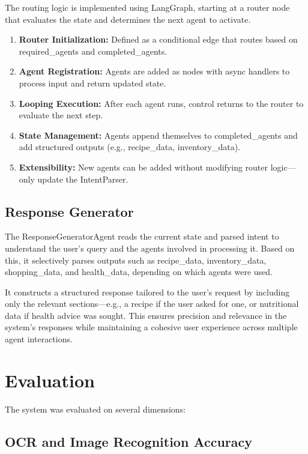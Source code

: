 \documentclass{ecai}
\begin{document}
The routing logic is implemented using LangGraph, starting at a router node that evaluates the state and determines the next agent to activate.
\begin{enumerate}[noitemsep,topsep=0pt]
    \item \textbf{Router Initialization:} Defined as a conditional edge that routes based on required\_agents and completed\_agents.
    \item \textbf{Agent Registration:} Agents are added as nodes with async handlers to process input and return updated state.
    \item \textbf{Looping Execution:} After each agent runs, control returns to the router to evaluate the next step.
    \item \textbf{State Management:} Agents append themselves to completed\_agents and add structured outputs (e.g., recipe\_data, inventory\_data).
    \item \textbf{Extensibility:} New agents can be added without modifying router logic—only update the IntentParser.
\end{enumerate}

\subsection{Response Generator}

The ResponseGeneratorAgent reads the current state and parsed intent to understand the user's query and the agents involved in processing it. Based on this, it selectively parses outputs such as recipe\_data, inventory\_data, shopping\_data, and health\_data, depending on which agents were used.

It constructs a structured response tailored to the user's request by including only the relevant sections—e.g., a recipe if the user asked for one, or nutritional data if health advice was sought. This ensures precision and relevance in the system's responses while maintaining a cohesive user experience across multiple agent interactions.

\section{Evaluation}

The system was evaluated on several dimensions:

\subsection{OCR and Image Recognition Accuracy}
\end{document}

